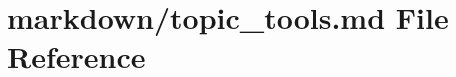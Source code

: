 \hypertarget{topic__tools_8md}{}\section{markdown/topic\+\_\+tools.md File Reference}
\label{topic__tools_8md}
